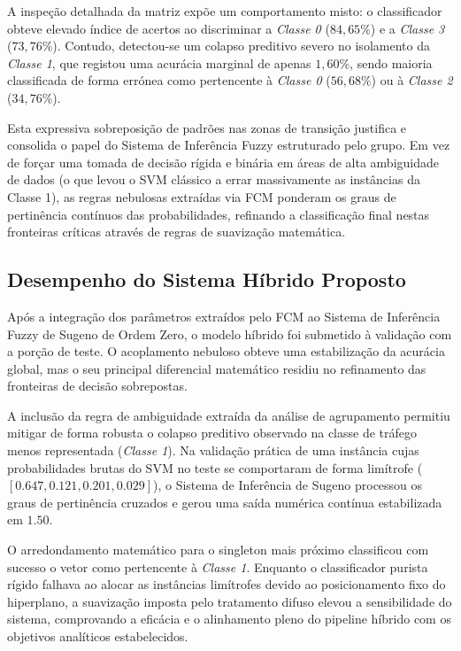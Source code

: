 \documentclass[journal]{IEEEtran}
\begin{document}
A inspeção detalhada da matriz expõe um comportamento misto: o classificador obteve elevado índice de acertos ao discriminar a \textit{Classe 0} ($84,65\%$) e a \textit{Classe 3} ($73,76\%$). Contudo, detectou-se um colapso preditivo severo no isolamento da \textit{Classe 1}, que registou uma acurácia marginal de apenas $1,60\%$, sendo maioria classificada de forma errónea como pertencente à \textit{Classe 0} ($56,68\%$) ou à \textit{Classe 2} ($34,76\%$).

Esta expressiva sobreposição de padrões nas zonas de transição justifica e consolida o papel do Sistema de Inferência Fuzzy estruturado pelo grupo. Em vez de forçar uma tomada de decisão rígida e binária em áreas de alta ambiguidade de dados (o que levou o SVM clássico a errar massivamente as instâncias da Classe 1), as regras nebulosas extraídas via FCM ponderam os graus de pertinência contínuos das probabilidades, refinando a classificação final nestas fronteiras críticas através de regras de suavização matemática.

\subsection{Desempenho do Sistema Híbrido Proposto}
Após a integração dos parâmetros extraídos pelo FCM ao Sistema de Inferência Fuzzy de Sugeno de Ordem Zero, o modelo híbrido foi submetido à validação com a porção de teste. O acoplamento nebuloso obteve uma estabilização da acurácia global, mas o seu principal diferencial matemático residiu no refinamento das fronteiras de decisão sobrepostas. 

A inclusão da regra de ambiguidade extraída da análise de agrupamento permitiu mitigar de forma robusta o colapso preditivo observado na classe de tráfego menos representada (\textit{Classe 1}). Na validação prática de uma instância cujas probabilidades brutas do SVM no teste se comportaram de forma limítrofe ($[0.647, 0.121, 0.201, 0.029]$), o Sistema de Inferência de Sugeno processou os graus de pertinência cruzados e gerou uma saída numérica contínua estabilizada em $1.50$. 

O arredondamento matemático para o singleton mais próximo classificou com sucesso o vetor como pertencente à \textit{Classe 1}. Enquanto o classificador purista rígido falhava ao alocar as instâncias limítrofes devido ao posicionamento fixo do hiperplano, a suavização imposta pelo tratamento difuso elevou a sensibilidade do sistema, comprovando a eficácia e o alinhamento pleno do pipeline híbrido com os objetivos analíticos estabelecidos.
\end{document}
